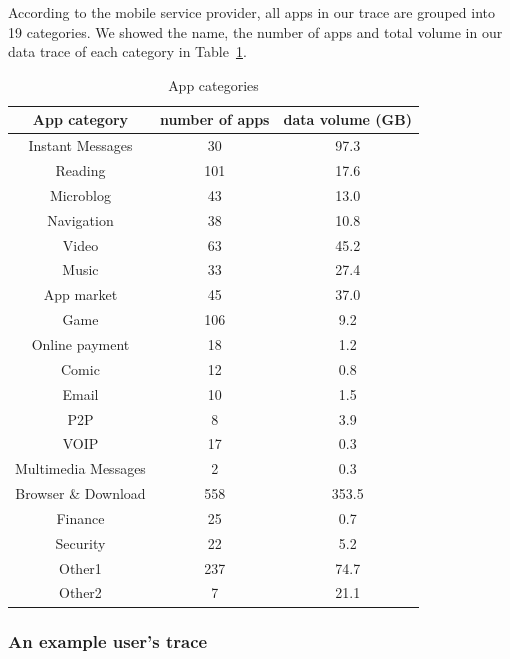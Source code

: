 According to the mobile service provider, all apps in our trace are grouped into 19 categories. We showed the name, the number of apps and total volume in our data trace of each category in Table~\ref{table:appcat}.  

\begin{table}
	\centering
	\begin{tabular}{ccc}\hline
	App category & number of apps & data volume (GB) \\ \hline
	Instant Messages & 30 & 97.3\\
	Reading & 101 & 17.6\\
	Microblog & 43 & 13.0\\
	Navigation & 38 & 10.8\\
	Video & 63 & 45.2\\
	Music & 33 & 27.4\\
	App market & 45 & 37.0\\
	Game & 106 & 9.2\\
	Online payment & 18 & 1.2\\
	Comic & 12 & 0.8\\
	Email & 10 & 1.5\\
	P2P & 8 & 3.9\\
	VOIP & 17 & 0.3\\
	Multimedia Messages & 2 & 0.3\\
	Browser \& Download & 558 & 353.5\\
	Finance & 25 & 0.7\\
	Security & 22 & 5.2\\
	Other1 & 237 & 74.7\\
	Other2 & 7 & 21.1\\ \hline
	\end{tabular}
	\caption{App categories}
	\label{table:appcat}
\end{table}

\subsubsection{An example user's trace}

